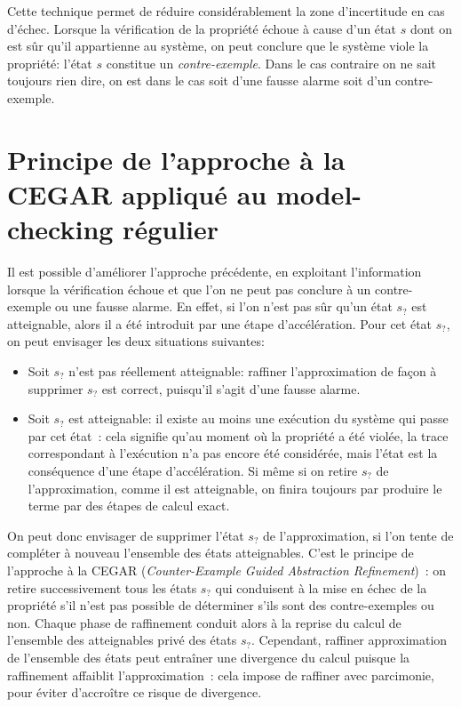 Cette technique permet de réduire considérablement la zone d'incertitude en cas d'échec.
Lorsque la vérification de la propriété échoue à cause d'un état $s$ dont on est sûr
qu'il appartienne au système, on peut conclure que le système viole la propriété:
l'état $s$ constitue un \emph{contre-exemple}. Dans le cas contraire on ne sait toujours rien dire,
on est  dans le cas soit d'une fausse alarme soit d'un contre-exemple.

\section{Principe de l'approche à la {CEGAR} appliqué au model-checking régulier}

Il est possible d'améliorer l'approche précédente, en exploitant l'information
lorsque la vérification échoue et que l'on ne peut pas conclure à un contre-exemple ou une fausse alarme.
En effet, si l'on n'est pas sûr qu'un état $s_?$ est atteignable, alors il a été introduit par une étape d'accélération.
Pour cet état $s_?$, on peut envisager les deux situations suivantes:

\begin{itemize}
\item
  Soit $s_?$ n'est pas réellement atteignable: raffiner l'approximation de façon
  à supprimer $s_?$ est correct, puisqu'il s'agit d'une fausse alarme.
\item
  Soit $s_?$ est atteignable: il existe au moins une exécution du système qui passe par cet état~:
  cela signifie qu'au moment où la propriété a été violée, la trace correspondant à l'exécution
  n'a pas encore été considérée, mais l'état est la conséquence d'une étape d'accélération. 
  Si même si on retire $s_?$ de l'approximation, comme il est atteignable, on finira toujours
  par produire le terme par des étapes de calcul exact. 
\end{itemize}
On peut donc envisager de supprimer l'état $s_?$ de l'approximation, si l'on tente de compléter à nouveau
l'ensemble des états atteignables. C'est le principe de l'approche à la {CEGAR}
(\emph{Counter-Example Guided Abstraction Refinement})~\cite{DBLP:conf/time/Clarke03}: on retire successivement tous les
états $s_?$ qui conduisent à la mise en échec de la propriété s'il n'est pas possible
de déterminer s'ils sont des contre-exemples ou non. Chaque phase de raffinement conduit 
alors à la reprise du calcul de l'ensemble des atteignables privé des états $s_?$.
Cependant, raffiner approximation de l'ensemble des états peut entraîner une divergence du calcul
puisque la raffinement affaiblit l'approximation~: cela impose de raffiner avec parcimonie, pour
éviter d'accroître ce risque de divergence.


